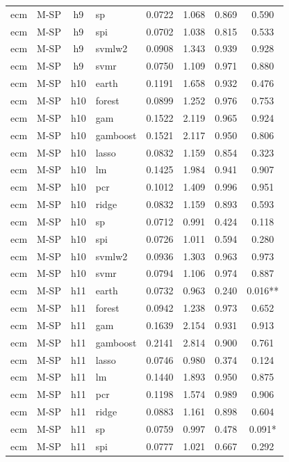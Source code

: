 \begin{ThreePartTable}
\begin{longtable}[t]{llclcccc}
ecm & M-SP & h9 & sp & 0.0722 & 1.068 & 0.869 & 0.590\\
ecm & M-SP & h9 & spi & 0.0702 & 1.038 & 0.815 & 0.533\\
ecm & M-SP & h9 & svmlw2 & 0.0908 & 1.343 & 0.939 & 0.928\\
ecm & M-SP & h9 & svmr & 0.0750 & 1.109 & 0.971 & 0.880\\
\addlinespace
ecm & M-SP & h10 & earth & 0.1191 & 1.658 & 0.932 & 0.476\\
ecm & M-SP & h10 & forest & 0.0899 & 1.252 & 0.976 & 0.753\\
ecm & M-SP & h10 & gam & 0.1522 & 2.119 & 0.965 & 0.924\\
ecm & M-SP & h10 & gamboost & 0.1521 & 2.117 & 0.950 & 0.806\\
ecm & M-SP & h10 & lasso & 0.0832 & 1.159 & 0.854 & 0.323\\
ecm & M-SP & h10 & lm & 0.1425 & 1.984 & 0.941 & 0.907\\
ecm & M-SP & h10 & pcr & 0.1012 & 1.409 & 0.996 & 0.951\\
ecm & M-SP & h10 & ridge & 0.0832 & 1.159 & 0.893 & 0.593\\
ecm & M-SP & h10 & sp & 0.0712 & 0.991 & 0.424 & 0.118\\
ecm & M-SP & h10 & spi & 0.0726 & 1.011 & 0.594 & 0.280\\
ecm & M-SP & h10 & svmlw2 & 0.0936 & 1.303 & 0.963 & 0.973\\
ecm & M-SP & h10 & svmr & 0.0794 & 1.106 & 0.974 & 0.887\\
\addlinespace
ecm & M-SP & h11 & earth & 0.0732 & 0.963 & 0.240 & 0.016**\\
ecm & M-SP & h11 & forest & 0.0942 & 1.238 & 0.973 & 0.652\\
ecm & M-SP & h11 & gam & 0.1639 & 2.154 & 0.931 & 0.913\\
ecm & M-SP & h11 & gamboost & 0.2141 & 2.814 & 0.900 & 0.761\\
ecm & M-SP & h11 & lasso & 0.0746 & 0.980 & 0.374 & 0.124\\
ecm & M-SP & h11 & lm & 0.1440 & 1.893 & 0.950 & 0.875\\
ecm & M-SP & h11 & pcr & 0.1198 & 1.574 & 0.989 & 0.906\\
ecm & M-SP & h11 & ridge & 0.0883 & 1.161 & 0.898 & 0.604\\
ecm & M-SP & h11 & sp & 0.0759 & 0.997 & 0.478 & 0.091*\\
ecm & M-SP & h11 & spi & 0.0777 & 1.021 & 0.667 & 0.292\\

\end{longtable}
\end{ThreePartTable}
